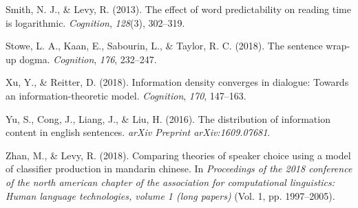 \documentclass[10pt, letterpaper]{article}
\begin{document}
\hypertarget{ref-smith2013}{}
Smith, N. J., \& Levy, R. (2013). The effect of word predictability on
reading time is logarithmic. \emph{Cognition}, \emph{128}(3), 302--319.

\hypertarget{ref-stowe2018}{}
Stowe, L. A., Kaan, E., Sabourin, L., \& Taylor, R. C. (2018). The
sentence wrap-up dogma. \emph{Cognition}, \emph{176}, 232--247.

\hypertarget{ref-xu2018}{}
Xu, Y., \& Reitter, D. (2018). Information density converges in
dialogue: Towards an information-theoretic model. \emph{Cognition},
\emph{170}, 147--163.

\hypertarget{ref-yu2016}{}
Yu, S., Cong, J., Liang, J., \& Liu, H. (2016). The distribution of
information content in english sentences. \emph{arXiv Preprint
arXiv:1609.07681}.

\hypertarget{ref-zhan2018}{}
Zhan, M., \& Levy, R. (2018). Comparing theories of speaker choice using
a model of classifier production in mandarin chinese. In
\emph{Proceedings of the 2018 conference of the north american chapter
of the association for computational linguistics: Human language
technologies, volume 1 (long papers)} (Vol. 1, pp. 1997--2005).


\end{document}
